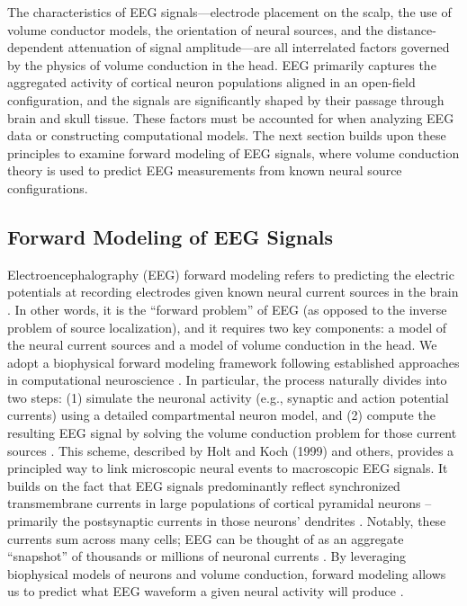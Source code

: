 \documentclass[final, a4paper,masters,en,listoffigures,listoftables,norwegiandates]{NMBU}
\begin{document}
The characteristics of EEG signals—electrode placement on the scalp, the use of volume conductor models, the orientation of neural sources, and the distance-dependent attenuation of signal amplitude—are all interrelated factors governed by the physics of volume conduction in the head. EEG primarily captures the aggregated activity of cortical neuron populations aligned in an open-field configuration, and the signals are significantly shaped by their passage through brain and skull tissue. These factors must be accounted for when analyzing EEG data or constructing computational models. The next section builds upon these principles to examine forward modeling of EEG signals, where volume conduction theory is used to predict EEG measurements from known neural source configurations.


\subsection{Forward Modeling of EEG Signals}

Electroencephalography (EEG) forward modeling refers to predicting the electric potentials at recording electrodes given known neural current sources in the brain \cite{Næss2015}. In other words, it is the “forward problem” of EEG (as opposed to the inverse problem of source localization), and it requires two key components: a model of the neural current sources and a model of volume conduction in the head. We adopt a biophysical forward modeling framework following established approaches in computational neuroscience \cite{Halnes2024ElectricBrainSignals, Holt1999}. In particular, the process naturally divides into two steps: (1) simulate the neuronal activity (e.g., synaptic and action potential currents) using a detailed compartmental neuron model, and (2) compute the resulting EEG signal by solving the volume conduction problem for those current sources \cite{Halnes2024ElectricBrainSignals}. This scheme, described by Holt and Koch (1999) \cite{Holt1999} and others, provides a principled way to link microscopic neural events to macroscopic EEG signals. It builds on the fact that EEG signals predominantly reflect synchronized transmembrane currents in large populations of cortical pyramidal neurons \cite{Buzsaki2012} – primarily the postsynaptic currents in those neurons’ dendrites \cite{Halnes2024ElectricBrainSignals}. Notably, these currents sum across many cells; EEG can be thought of as an aggregate “snapshot” of thousands or millions of neuronal currents \cite{kandel2021principles}. By leveraging biophysical models of neurons and volume conduction, forward modeling allows us to predict what EEG waveform a given neural activity will produce \cite{Næss2015, Halnes2024ElectricBrainSignals}.
\end{document}
